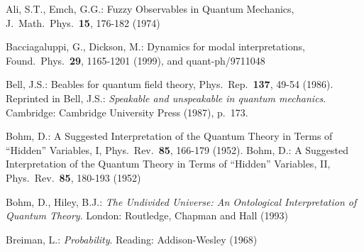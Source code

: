 \documentclass[12pt]{article}
\newcommand{\1}{\mathbf{1}} %
\begin{document}
\begin{thebibliography}{28.}

 Ali, S.T., Emch, G.G.: Fuzzy Observables in Quantum
   Mechanics, J.\ Math.\ Phys.\ \textbf{15}, 176-182 (1974)


 Bacciagaluppi, G., Dickson, M.: Dynamics for modal
   interpretations, Found.\ Phys.\ \textbf{29},
   1165-1201 (1999), and quant-ph/9711048

 Bell, J.S.: Beables for quantum field theory,
   Phys.\ Rep.\ \textbf{137}, 49-54 (1986). Reprinted in Bell, J.S.:
   \textit{Speakable and unspeakable in quantum mechanics}.
   Cambridge: Cambridge University Press (1987), p.~173.




 Bohm, D.: A Suggested Interpretation of the Quantum
   Theory in Terms of ``Hidden'' Variables, I, Phys.\ Rev.\
   \textbf{85}, 166-179 (1952).  Bohm, D.: A Suggested Interpretation
   of the Quantum Theory in Terms of ``Hidden'' Variables, II, Phys.\
   Rev.\ \textbf{85}, 180-193 (1952)

 Bohm, D., Hiley, B.J.: \textit{The Undivided Universe: An
   Ontological Interpretation of Quantum Theory}. London: Routledge,
   Chapman and Hall (1993)

 Breiman, L.: \textit{Probability}. Reading:
   Addison-Wesley (1968)




\end{thebibliography}
\end{document}
